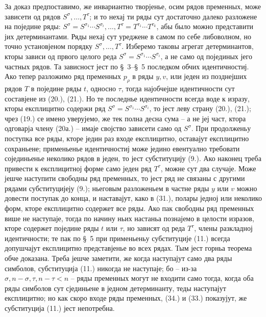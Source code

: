 ﻿\documentclass[11pt]{article}
\begin{document}
За доказ предпоставимо, же инвариантно творјенье, осим рядов пременных, може зависети од рядов $S^\sigma,\ldots,T^\tau$; и то нехај ти ряды сут достаточно далеко разложене на поједине ряды:
$S^\sigma=S^{\sigma_1}\cdots S^{\sigma_i},\ldots,T^\tau=T^{\tau_1}\cdots T^{\tau_k}$, абы было можно представити јих детерминантами. Ряды нехај сут уреджене в самом по себе либоволном, но точно установјеном порядку $S^\sigma,\ldots,T^\tau$. Изберемо таковы агрегат детерминантов, кторы зависи од првого целого реда $S^\sigma=S^{\sigma_1}\cdots S^{\sigma_i}$, а не само од појединых јего частных рядов. Та зависност јест по \S\ 3--\S\ 5 последком обчих идентичностиј. Ако тепер разложимо ряд пременных $p_\rho$ в ряды $y,v$, или једен из позднејших рядов $T$ в поједине ряды $t$, односно $\tau$, тогда најобчејше идентичности сут составјене из (20.), (21.). Но те последнье идентичности всегда воде к изразу, кторы експлицитно содержи ряд $S^\sigma=S^{\sigma_1}\cdots S^{\sigma_i}$, то јест леву страну (20.), (21.); чрез (19.) се имено уверујемо, же тек полна десна сума -- а не јеј част, ктора одговарја члену (20а.) -- имаје својство зависети само од $S^\sigma$. При продолженьу поступка все ряды, кторе једин раз входе експлицитно, оставајут експлицитно сохраньене; применьенье идентичностиј може једино евентуално требовати сојединьенье неколико рядов в једен, то јест субституцију (9.). Ако наконец треба привести к експлицитној форме само једен ряд $T^\tau$, можне сут два случаје. Може јешче наступити свободны ряд пременных, то јест ряд не связаны с другими рядами субституцијеју (9.); ньеговым разложеньем в частне ряды $y$ или $v$ можно довести поступак до конца, и наставајут, како в (31.), полары једној или неколико форм, кторе експлицитно содержет все ряды. Ако пак свободны ряд пременных више не наступаје, тогда по начину ньих настаньа познајемо в целости изразов, кторе содержет поједине ряды $t$ или $\tau$, но зависят од реда $T^\tau$, члены разкладној идентичности; те пак по \S\ 5 при применьеньу субституције (11.) всегда допушчајут експлицитно представјенье во всех рядах. Тым јест горньа теорема обче доказана. Треба јешче заметити, же когда наступајут само два ряды симболов, субституција (11.) никогда не наступаје; бо -- из-за $\sigma,n-\sigma,\tau,n-\tau<n$ -- ряды пременных могут не входити само тогда, когда оба ряды симболов сут сјединьене в једном детерминанту, теды наступајут експлицитно; но как скоро входе ряды пременных, (34.) и (33.) показујут, же субституција (11.) јест непотребна.
\end{document}
